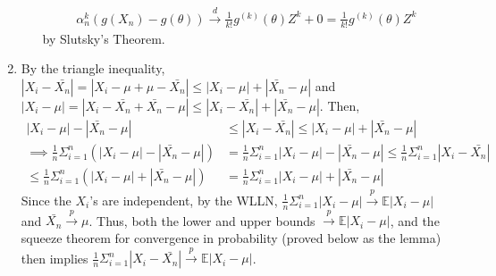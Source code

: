 \documentclass[12pt]{article}
\newcommand{\E}{\mathbb{E}}
\begin{document}
\begin{enumerate}
\begin{enumerate}
        \begin{align*}
            \alpha_n^k(g(X_n) - g(\theta)) \overset{d}{\to} \frac{1}{k!}g^{(k)}(\theta)Z^k + 0 = \frac{1}{k!}g^{(k)}(\theta)Z^k
        \end{align*} by Slutsky's Theorem.
    \end{enumerate}
    \item By the triangle inequality, $|X_i-\bar{X_n}| = |X_i-\mu+\mu-\bar{X_n}| \leq |X_i-\mu| + |\bar{X_n}-\mu|$ and $|X_i-\mu| = |X_i-\bar{X_n}+\bar{X_n}-\mu| \leq |X_i-\bar{X_n}| + |\bar{X_n}-\mu|$. Then,
    \begin{align*}
        |X_i-\mu| - |\bar{X_n}-\mu| &\leq |X_i-\bar{X_n}| \leq |X_i-\mu| + |\bar{X_n}-\mu|\\
        \implies \frac{1}{n}\Sigma_{i=1}^n (|X_i-\mu| - |\bar{X_n}-\mu|) &= \frac{1}{n}\Sigma_{i=1}^n |X_i-\mu| - |\bar{X_n}-\mu| \leq \frac{1}{n}\Sigma_{i=1}^n |X_i-\bar{X_n}|\\
        \leq \frac{1}{n}\Sigma_{i=1}^n (|X_i-\mu| + |\bar{X_n}-\mu|) &= \frac{1}{n}\Sigma_{i=1}^n |X_i-\mu| + |\bar{X_n}-\mu|
    \end{align*} Since the $X_i$'s are independent, by the WLLN, $\frac{1}{n}\Sigma_{i=1}^n |X_i - \mu| \overset{p}{\to} \E|X_i - \mu|$ and $\bar{X_n} \overset{p}{\to} \mu$. Thus, both the lower and upper bounds $\overset{p}{\to} \E|X_i - \mu|$, and the squeeze theorem for convergence in probability (proved below as the lemma) then implies $\frac{1}{n}\Sigma_{i=1}^n |X_i-\bar{X_n}| \overset{p}{\to} \E|X_i - \mu|$.
    

\end{enumerate}
\end{document}
